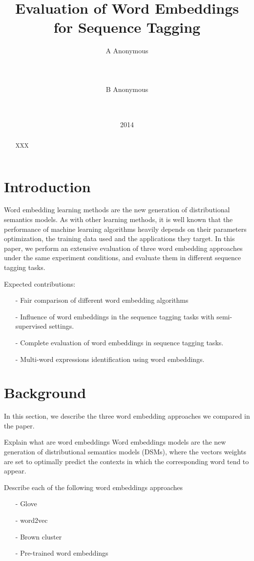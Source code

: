 \documentclass[11pt]{article}
\title{Evaluation of Word Embeddings for Sequence Tagging }
\author{A Anonymous 
   \\%
   \\ %
   \\ %
  \\ %
\And
  B Anonymous
   \\%
   \\%
   \\ %
}
\date{2014}
\begin{document}
\maketitle
\begin{abstract}
XXX
\end{abstract}

\section{Introduction}
Word embedding learning methods are the new generation of distributional semantics models.
As with other learning methods, it is well known that the performance of machine learning algorithms heavily depends on their parameters optimization, the training data used and the applications they target. 
In this paper, we perform an extensive evaluation of three word embedding approaches under the same experiment conditions, and evaluate them in different
sequence tagging tasks. 

Expected contributions:
\begin{itemize}
\item[-] Fair comparison of different word embedding algorithms
\item[-] Influence of word embeddings in the sequence tagging tasks with semi-supervised settings.
\item[-] Complete evaluation of word embeddings in sequence tagging tasks.
\item[-] Multi-word expressions identification using word embeddings.
\end{itemize}


\section{Background}
In this section, we describe the three word embedding approaches we compared in the paper.

{\color{blue}Explain what are word embeddings}
Word embeddings models are the new generation of distributional semantics models (DSMs), where the vectors weights are set to optimally predict the contexts in which the corresponding word tend to appear.

{\color{blue}Describe each of the following word embeddings approaches}
\begin{itemize}
\item[-] Glove \cite{pennington2014glove}
\item[-] word2vec \cite{Mikolov13}
\item[-] Brown cluster \cite{Brown92class-basedn-gram}
\item[-] Pre-trained word embeddings \cite{Turian10wordrepresentations}
\end{itemize}
\end{document}
